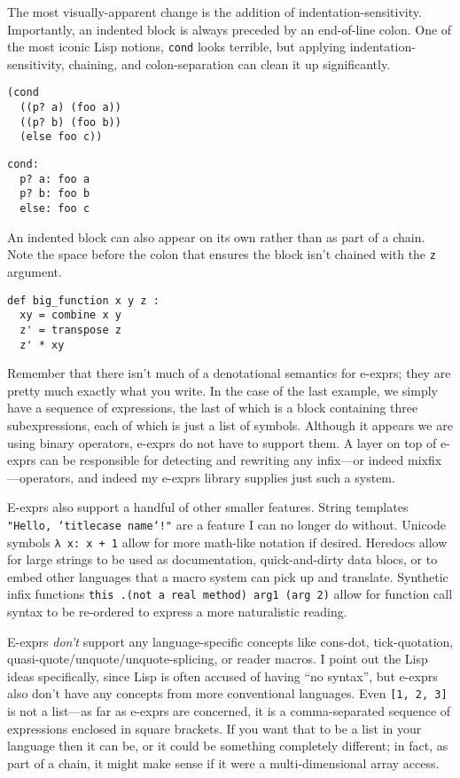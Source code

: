 \documentclass[11pt]{article} %
\begin{document}
The most visually-apparent change is the addition of indentation-sensitivity.
Importantly, an indented block is always preceded by an end-of-line colon.
One of the most iconic Lisp notions, \texttt{cond} looks terrible, but applying indentation-sensitivity, chaining, and colon-separation can clean it up significantly.
\begin{center}
\begin{verbatim}
(cond
  ((p? a) (foo a))
  ((p? b) (foo b))
  (else foo c))
\end{verbatim}
\begin{verbatim}
cond:
  p? a: foo a
  p? b: foo b
  else: foo c
\end{verbatim}
\end{center}
An indented block can also appear on its own rather than as part of a chain.
Note the space before the colon that ensures the block isn't chained with the \texttt{z} argument.
\begin{center}
\begin{verbatim}
def big_function x y z :
  xy = combine x y
  z' = transpose z
  z' * xy
\end{verbatim}
\end{center}


Remember that there isn't much of a denotational semantics for e-exprs; they are pretty much exactly what you write.
In the case of the last example, we simply have a sequence of expressions, the last of which is a block containing three subexpressions, each of which is just a list of symbols.
Although it appears we are using binary operators, e-exprs do not have to support them.
A layer on top of e-exprs can be responsible for detecting and rewriting any infix---or indeed mixfix---operators, and indeed my e-exprs library supplies just such a system.

E-exprs also support a handful of other smaller features.
String templates \texttt{"Hello, `titlecase name`!"} are a feature I can no longer do without.
Unicode symbols \texttt{λ x: x + 1} allow for more math-like notation if desired.
Heredocs allow for large strings to be used as documentation, quick-and-dirty data blocs, or to embed other languages that a macro system can pick up and translate.
Synthetic infix functions \texttt{this .(not a real method) arg1 (arg 2)} allow for function call syntax to be re-ordered to express a more naturalistic reading.

E-exprs \emph{don't} support any language-specific concepts like cons-dot, tick-quotation, quasi-quote/unquote/unquote-splicing, or reader macros.
I point out the Lisp ideas specifically, since Lisp is often accused of having ``no syntax'', but e-exprs also don't have any concepts from more conventional languages.
Even \texttt{[1, 2, 3]} is not a list---as far as e-exprs are concerned, it is a comma-separated sequence of expressions enclosed in square brackets.
If you want that to be a list in your language then it can be, or it could be something completely different; in fact, as part of a chain, it might make sense if it were a multi-dimensional array access.
\end{document}
